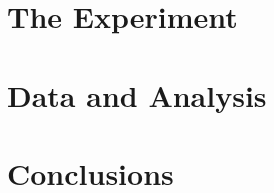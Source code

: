 \section{The Experiment}
\label{sec:experm}


\section{Data and Analysis}
\label{danal}


\section{Conclusions}
\label{conclusions}


\begin{singlespace}
\newpage


\end{singlespace}



